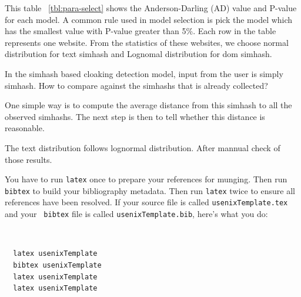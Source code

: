 This table ~\autoref{tbl:para-select} shows the Anderson-Darling (AD) value and P-value for each model.
A common rule used in model selection is pick the model which has the smallest
value with P-value greater than 5\%. Each row in the table represents one
website. From the statistics of these websites, we choose normal distribution
for text simhash and Lognomal distribution for dom simhash.

In the simhash based cloaking detection model, input from the user is simply simhash. How to compare against the simhashs that is already collected?

One simple way is to compute the average distance from this simhash to all the observed simhashs. The next step is then to tell whether this distance is reasonable. 

The text distribution follows lognormal distribution.
After mannual check of those results.




You have to run {\tt latex} once to prepare your references for
munging.  Then run {\tt bibtex} to build your bibliography metadata.
Then run {\tt latex} twice to ensure all references have been resolved.
If your source file is called {\tt usenixTemplate.tex} and your {\tt
bibtex} file is called {\tt usenixTemplate.bib}, here's what you do:
{\tt \small
  \begin{verbatim}
  latex usenixTemplate
  bibtex usenixTemplate
  latex usenixTemplate
  latex usenixTemplate
  \end{verbatim}
}


